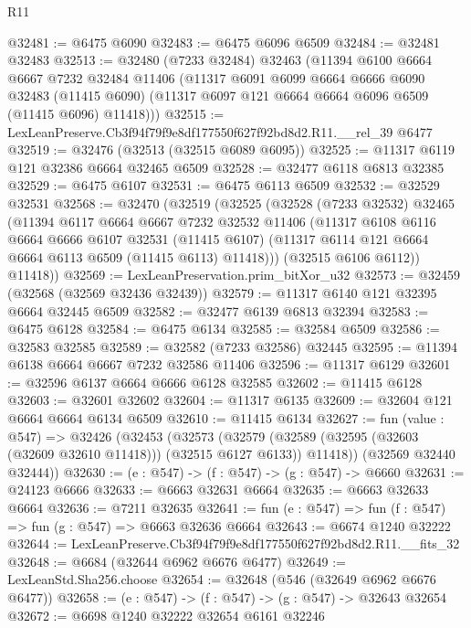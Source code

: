 \begin{lexlean}{R11}
\begin{coremodule}
@32481 := @6475 @6090
@32483 := @6475 @6096 @6509
@32484 := @32481 @32483
@32513 := @32480
    (@7233 @32484)
    @32463
    (@11394
      @6100
      @6664
      @6667
      @7232
      @32484
      @11406
      (@11317
        @6091
        @6099
        @6664
        @6666
        @6090
        @32483
        (@11415 @6090)
        (@11317 @6097 @121 @6664 @6664 @6096 @6509 (@11415 @6096) @11418)))
@32515 := LexLeanPreserve.Cb3f94f79f9e8df177550f627f92bd8d2.R11.__rel_39 @6477
@32519 := @32476 (@32513 (@32515 @6089 @6095))
@32525 := @11317 @6119 @121 @32386 @6664 @32465 @6509
@32528 := @32477 @6118 @6813 @32385
@32529 := @6475 @6107
@32531 := @6475 @6113 @6509
@32532 := @32529 @32531
@32568 := @32470
    (@32519
      (@32525
        (@32528
          (@7233 @32532)
          @32465
          (@11394
            @6117
            @6664
            @6667
            @7232
            @32532
            @11406
            (@11317
              @6108
              @6116
              @6664
              @6666
              @6107
              @32531
              (@11415 @6107)
              (@11317 @6114 @121 @6664 @6664 @6113 @6509 (@11415 @6113) @11418)))
          (@32515 @6106 @6112))
        @11418))
@32569 := LexLeanPreservation.prim_bitXor_u32
@32573 := @32459 (@32568 (@32569 @32436 @32439))
@32579 := @11317 @6140 @121 @32395 @6664 @32445 @6509
@32582 := @32477 @6139 @6813 @32394
@32583 := @6475 @6128
@32584 := @6475 @6134
@32585 := @32584 @6509
@32586 := @32583 @32585
@32589 := @32582 (@7233 @32586) @32445
@32595 := @11394 @6138 @6664 @6667 @7232 @32586 @11406
@32596 := @11317 @6129
@32601 := @32596 @6137 @6664 @6666 @6128 @32585
@32602 := @11415 @6128
@32603 := @32601 @32602
@32604 := @11317 @6135
@32609 := @32604 @121 @6664 @6664 @6134 @6509
@32610 := @11415 @6134
@32627 := fun (value : @547) =>
  @32426
    (@32453
      (@32573
        (@32579 (@32589 (@32595 (@32603 (@32609 @32610 @11418))) (@32515 @6127 @6133)) @11418))
      (@32569 @32440 @32444))
@32630 := (e : @547) -> (f : @547) -> (g : @547) -> @6660
@32631 := @24123 @6666
@32633 := @6663 @32631 @6664
@32635 := @6663 @32633 @6664
@32636 := @7211 @32635
@32641 := fun (e : @547) => fun (f : @547) => fun (g : @547) => @6663 @32636 @6664
@32643 := @6674 @1240 @32222
@32644 := LexLeanPreserve.Cb3f94f79f9e8df177550f627f92bd8d2.R11.__fits_32
@32648 := @6684 (@32644 @6962 @6676 @6477)
@32649 := LexLeanStd.Sha256.choose
@32654 := @32648 (@546 (@32649 @6962 @6676 @6477))
@32658 := (e : @547) -> (f : @547) -> (g : @547) -> @32643 @32654
@32672 := @6698
    @1240
    @32222
    @32654
    @6161
    @32246

\end{coremodule}
\end{lexlean}

